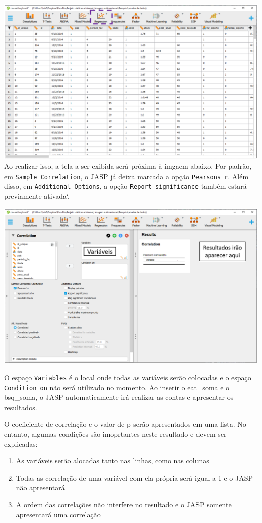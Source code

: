 \documentclass[
]{book}
\providecommand{\tightlist}{%
  \setlength{\itemsep}{0pt}\setlength{\parskip}{0pt}}
\begin{document}
\includegraphics{./img/cap_correlacao_interface.png}
Ao realizar isso, a tela a ser exibida será próxima à imgaem abaixo. Por padrão, em \texttt{Sample\ Correlation}, o JASP já deixa marcada a opção \texttt{Pearson\textquotesingle{}s\ r}. Além disso, em \texttt{Additional\ Options}, a opção \texttt{Report\ significance} também estará previamente ativada`.

\includegraphics{./img/cap_correlacao_interface2.png}

O espaço \texttt{Variables} é o local onde todas as variáveis serão colocadas e o espaço \texttt{Condition\ on} não será utilizado no momento. Ao inserir o eat\_soma e o bsq\_soma, o JASP automaticamente irá realizar as contas e apresentar os resultados.

O coeficiente de correlação e o valor de p serão apresentados em uma lista. No entanto, algumas condições são imoprtantes neste resultado e devem ser explicadas:

\begin{enumerate}
\def\labelenumi{\arabic{enumi}.}
\tightlist
\item
  As variáveis serão alocadas tanto nas linhas, como nas colunas\\
\item
  Todas as correlação de uma variável com ela própria será igual a 1 e o JASP não apresentará\\
\item
  A ordem das correlações não interfere no resultado e o JASP somente apresentará uma correlação
\end{enumerate}
\end{document}
